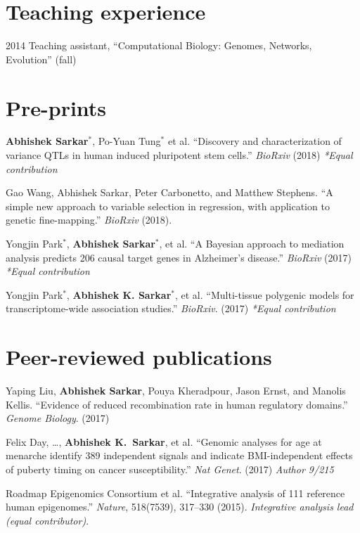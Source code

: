 \documentclass{article}
\begin{document}
\section*{Teaching experience}
\begin{hdesc}[itemsep=1em]
\item[2014] Teaching assistant, ``Computational Biology: Genomes, Networks, Evolution'' (fall)
\end{hdesc}

\section*{Pre-prints}
\begin{henum}
\item \textbf{Abhishek Sarkar$^*$}, Po-Yuan Tung$^*$ et al. ``Discovery and
  characterization of variance QTLs in human induced pluripotent stem cells.''
  \emph{BioRxiv} (2018) \emph{*Equal contribution}
\item Gao Wang, Abhishek Sarkar, Peter Carbonetto, and Matthew Stephens. ``A
  simple new approach to variable selection in regression, with application to
  genetic fine-mapping.'' \emph{BioRxiv} (2018).
\item Yongjin Park$^*$, \textbf{Abhishek Sarkar$^*$}, et al. ``A Bayesian
  approach to mediation analysis predicts 206 causal target genes in
  Alzheimer's disease.'' \emph{BioRxiv} (2017) \emph{*Equal contribution}
\item Yongjin Park$^*$, \textbf{Abhishek K. Sarkar}$^*$, et al. ``Multi-tissue
  polygenic models for transcriptome-wide association studies.''
  \emph{BioRxiv}. (2017) \emph{*Equal contribution}
\end{henum}

\section*{Peer-reviewed publications}
\begin{henum}
\item Yaping Liu, \textbf{Abhishek Sarkar}, Pouya Kheradpour, Jason Ernst, and
  Manolis Kellis. ``Evidence of reduced recombination rate in human regulatory
  domains.'' \emph{Genome Biology}. (2017)
\item Felix Day, \ldots, \textbf{Abhishek K.\ Sarkar}, et al. ``Genomic
  analyses for age at menarche identify 389 independent signals and indicate
  BMI-independent effects of puberty timing on cancer susceptibility.''
  \emph{Nat Genet}. (2017) \emph{Author 9/215}
\item Roadmap Epigenomics Consortium et al. ``Integrative analysis of 111
  reference human epigenomes.'' \emph{Nature}, 518(7539), 317–330 (2015).
  \emph{Integrative analysis lead (equal contributor)}.
\end{henum}
\end{document}

